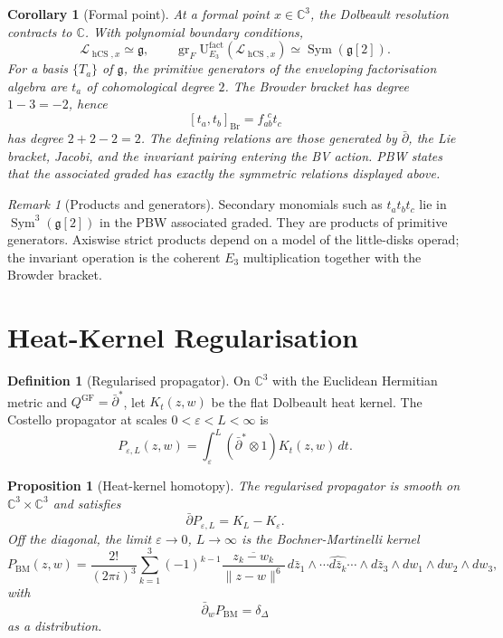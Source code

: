 \documentclass[11pt]{amsart}
\providecommand{\C}{\mathbb{C}}
\providecommand{\dbar}{\bar{\partial}}
\providecommand{\dbarstar}{\bar{\partial}^{\ast}}
\providecommand{\fg}{\mathfrak{g}}
\providecommand{\Sym}{\operatorname{Sym}}
\providecommand{\hCS}{\operatorname{hCS}}
\providecommand{\cL}{\mathcal{L}}
\providecommand{\Ethree}{E_3}
\theoremstyle{plain}
\newtheorem{proposition}[theorem]{Proposition}
\newtheorem{corollary}[theorem]{Corollary}
\theoremstyle{definition}
\newtheorem{definition}[theorem]{Definition}
\theoremstyle{remark}
\newtheorem{remark}[theorem]{Remark}
\begin{document}
\begin{corollary}[Formal point]
\label{cor:formal-point}
At a formal point \(x\in\C^3\), the Dolbeault resolution contracts to
\(\C\). With polynomial boundary conditions,
\[
  \cL_{\hCS,x}\simeq \fg,
  \qquad
  \operatorname{gr}_F
  \mathrm U^{\mathrm{fact}}_{\Ethree}(\cL_{\hCS,x})
  \simeq
  \Sym(\fg[2]).
\]
For a basis \(\{T_a\}\) of \(\fg\), the primitive generators of the
enveloping factorisation algebra are \(t_a\) of cohomological degree
\(2\). The Browder bracket has degree \(1-3=-2\), hence
\[
  [t_a,t_b]_{\mathrm{Br}}
  =
  f_{ab}^{\ \ c}t_c
\]
has degree \(2+2-2=2\). The defining relations are those generated by
\(\dbar\), the Lie bracket, Jacobi, and the invariant pairing entering
the BV action. PBW states that the associated graded has exactly the
symmetric relations displayed above.
\end{corollary}

\begin{remark}[Products and generators]
\label{rem:products-generators}
Secondary monomials such as \(t_at_bt_c\) lie in
\(\Sym^3(\fg[2])\) in the PBW associated graded. They are products of
primitive generators. Axiswise strict products depend on a model of the
little-disks operad; the invariant operation is the coherent
\(\Ethree\) multiplication together with the Browder bracket.
\end{remark}

\section{Heat-Kernel Regularisation}
\label{sec:heat-kernel}

\begin{definition}[Regularised propagator]
\label{def:regularised-propagator}
On \(\C^3\) with the Euclidean Hermitian metric and
\(Q^{\mathrm{GF}}=\dbarstar\), let \(K_t(z,w)\) be the flat Dolbeault
heat kernel. The Costello propagator at scales \(0<\varepsilon<L<\infty\)
is
\[
  P_{\varepsilon,L}(z,w)
  =
  \int_\varepsilon^L(\dbarstar\otimes1)K_t(z,w)\,dt .
\]
\end{definition}

\begin{proposition}[Heat-kernel homotopy]
\label{prop:heat-homotopy}
The regularised propagator is smooth on
\(\C^3\times\C^3\) and satisfies
\[
  \dbar P_{\varepsilon,L}=K_L-K_\varepsilon .
\]
Off the diagonal, the limit \(\varepsilon\to0\), \(L\to\infty\) is the
Bochner-Martinelli kernel
\[
  P_{\mathrm{BM}}(z,w)
  =
  \frac{2!}{(2\pi i)^3}
  \sum_{k=1}^{3}(-1)^{k-1}
  \frac{\overline{z_k-w_k}}{\|z-w\|^6}\,
  d\bar z_1\wedge\cdots\widehat{d\bar z_k}\cdots\wedge d\bar z_3
  \wedge dw_1\wedge dw_2\wedge dw_3 ,
\]
with
\[
  \dbar_w P_{\mathrm{BM}}=\delta_\Delta
\]
as a distribution.
\end{proposition}
\end{document}

